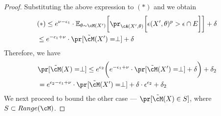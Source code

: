 \begin{proof}
Substituting the above expression to $(*)$ and we obtain
\begin{align*}
&(*) \leq e^{\nu -\epsilon_1}\cdot \mathbb{E}_{\theta \sim \cM(X')} \bigg[\pr_{\cA(X', \theta)}\bigg[\epsilon(X', \theta)^p >\epsilon \cap E \bigg]\bigg] + \delta\\
&\leq e^{-\epsilon_1 + \nu}\cdot \pr[{\tilde{\cM}(X')=\perp}] + \delta
\end{align*}
Therefore, we have 
\begin{align*}
& \pr[\tilde{\cM}(X)=\perp] \leq e^{\epsilon_2}\bigg(e^{-\epsilon_1 +\nu}\cdot \pr[\tilde{\cM}(X')=\perp ]+\delta\bigg)+ \delta_2\\
&= e^{\epsilon_2 -\epsilon_1 +\nu}\cdot \pr[\tilde{\cM}(X')=\perp] + \delta\cdot \epsilon^{\epsilon_2} +\delta_2
\end{align*}
We next proceed to bound the other case --- $\pr[\tilde{\cM}(X) \in S]$, where $S \subset Range(\cM)$.


\end{proof}
